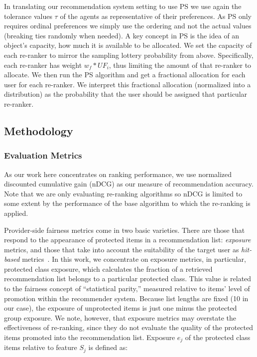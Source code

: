 In translating our recommendation system setting to use PS we use again the tolerance values $\tau$ of the agents as representative of their preferences. As PS only requires ordinal preferences we simply use the ordering and not the actual values (breaking ties randomly when needed). A key concept in PS is the idea of an object's capacity, how much it is available to be allocated. 
We set the capacity of each re-ranker to mirror the sampling lottery probability from above.
Specifically, each re-ranker has weight $w_f * UF_i$, thus limiting the amount of that re-ranker to allocate.
We then run the PS algorithm and get a fractional allocation for each user for each re-ranker.  We interpret this fractional allocation (normalized into a distribution) as the probability that the user should be assigned that particular re-ranker.


\subsection{\textbf{Methodology}}
\subsubsection{\textbf{Evaluation Metrics}}
\hfill

As our work here concentrates on ranking performance, we use normalized discounted cumulative gain (nDCG) as our measure of recommendation accuracy. Note that we are only evaluating re-ranking algorithms so nDCG is limited to some extent by the performance of the base algorithm to which the re-ranking is applied. 

Provider-side fairness metrics come in two basic varieties. There are those that respond to the appearance of protected items in a recommendation list: \textit{exposure} metrics, and those that take into account the suitability of the target user as \textit{hit-based} metrics~\cite{abdollahpouri-umuai-2020}. In this work, we concentrate on exposure metrics, in particular, protected class exposure, which calculates the fraction of a retrieved recommendation list belongs to a particular protected class. This value is related to the fairness concept of ``statistical parity,'' measured relative to items' level of promotion within the recommender system. Because list lengths are fixed (10 in our case), the exposure of unprotected items is just one minus the protected group exposure. We note, however, that exposure metrics may overstate the effectiveness of re-ranking, since they do not evaluate the quality of the protected items promoted into the recommendation list. Exposure $e_j$ of the protected class items relative to feature $S_j$ is defined as:

